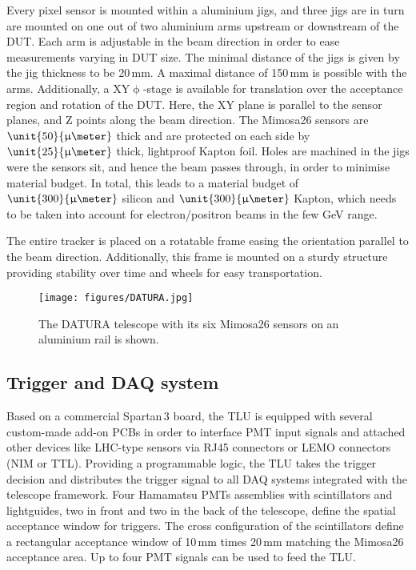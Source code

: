 Every pixel sensor is mounted within a aluminium jigs, and three jigs are in turn are mounted on one out of two aluminium arms upstream or downstream of the DUT. 
Each arm is adjustable in the beam direction in order to ease measurements varying in DUT size.
The minimal distance of the jigs is given by the jig thickness to be 20\,mm. 
A maximal distance of 150\,mm is possible with the arms. 
Additionally, a XY$\upphi$-stage is available for translation over the acceptance region and rotation of the DUT. 
Here, the XY plane is parallel to the sensor planes, and Z points along the beam direction. 
The Mimosa26 sensors are $\unit{50}{\upmu\meter}$ thick and are protected on each side by $\unit{25}{\upmu\meter}$ thick, lightproof Kapton foil. 
Holes are machined in the jigs were the sensors sit, and hence the beam passes through, in order to minimise material budget. 
In total, this leads to a material budget of $\unit{300}{\upmu\meter}$ silicon and $\unit{300}{\upmu\meter}$ Kapton, which needs to be taken into account for electron/positron beams in the few GeV range. 

The entire tracker is placed on a rotatable frame easing the orientation parallel to the beam direction. 
Additionally, this frame is mounted on a sturdy structure providing stability over time and wheels for easy transportation. 

\begin{figure}[tb]
	\center
	\texttt{[image: figures/DATURA.jpg]}
	\caption[The DATURA telescope]{The DATURA telescope with its six Mimosa26 sensors on an aluminium rail is shown.}
	\label{fig:datura-tscope}
\end{figure}

\subsection{Trigger and DAQ system}

Based on a commercial Spartan\,3 board, the TLU is equipped with several custom-made add-on PCBs in order to interface PMT input signals
 and attached other devices like LHC-type sensors via RJ45 connectors or LEMO connectors (NIM or TTL). 
Providing a programmable logic, the TLU  takes the trigger decision and distributes the trigger signal to all DAQ systems integrated with the telescope framework.
Four Hamamatsu PMTs assemblies with scintillators and lightguides, two in front and two in the back of the telescope, define the spatial acceptance window for triggers. 
The cross configuration of the scintillators define a rectangular acceptance window of 10\,mm times 20\,mm matching the Mimosa26 acceptance area. 
Up to four PMT signals can be used to feed the TLU. 

